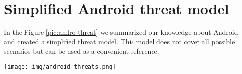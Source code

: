 \section{Simplified Android threat model}

In the Figure \ref{pic:andro-threat} we summarized our knowledge about Android and created a simplified threat model. This model does not cover all possible scenarios but can be used as a convenient reference.

\begin{figure*}[!t]
\centering
\texttt{[image: img/android-threats.png]}
\caption{Simplified Android threat model}
\label{pic:andro-threat}
\end{figure*}
